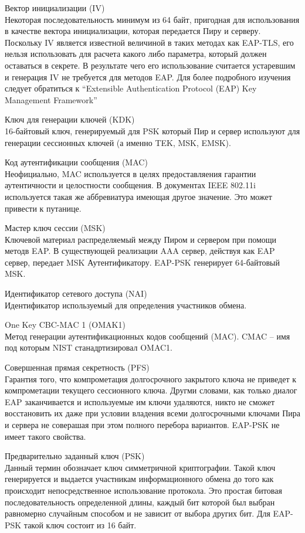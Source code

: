 Вектор инициализации (IV) \\ Некоторая последовательность минимум из 64 байт, пригодная для использования в качестве вектора инициализации, которая передается Пиру и серверу. Поскольку IV является известной величиной в таких методах как EAP-TLS, его нельзя использовать для расчета какого либо параметра, который должен оставаться в секрете. В результате чего его использование считается устаревшим и генерация IV не требуется для методов EAP. Для более подробного изучения следует обратиться к ``Extensible Authentication Protocol (EAP) Key Management Framework''

Ключ для генерации ключей (KDK) \\ 16-байтовый ключ, генерируемый для PSK который Пир и сервер используют для генерации сессионных ключей (а именно TEK, MSK, EMSK).

Код аутентификации сообщения (MAC) \\ Неофициально, MAC используется в целях предоставляения гарантии аутентичности и целостности сообщения. В документах IEEE 802.11i используется такая же аббревиатура имеющая другое значение. Это может привести к путанице.

Мастер ключ сессии (MSK) \\ Ключевой материал распределяемый между Пиром и сервером при помощи методв EAP. В существующей реализации AAA сервер, действуя как EAP сервер, передает MSK Аутентификатору. EAP-PSK генерирует 64-байтовый MSK.

Идентификатор сетевого доступа (NAI) \\ Идентификатор используемый для определения участников обмена.

One Key CBC-MAC 1 (OMAK1) \\ Метод генерации аутентификационных кодов сообщений (MAC). CMAC -- имя под которым NIST станадртизировал OMAC1.

Совершенная прямая секретность (PFS) \\ Гарантия того, что компрометация долгосрочного закрытого ключа не приведет к компрометации текущего сессионного ключа. Другми словами, как только диалог EAP заканчивается и используемые им ключи удаляются, никто не сможет восстановить их даже при условии владения всеми долгосрочными ключами Пира и сервера не соверашая при этом полного перебора вариантов. EAP-PSK не имеет такого свойства.

Предварительно заданный ключ (PSK) \\ Данный термин обозначает ключ симметричной криптографии. Такой ключ генерируется и выдается участникам информационного обмена до того как происходит непосредственное использование протокола. Это простая битовая последовательность определенной длины, каждый бит которой был выбран равномерно случайным способом и не зависит от выбора других бит. Для EAP-PSK такой ключ состоит из 16 байт.

